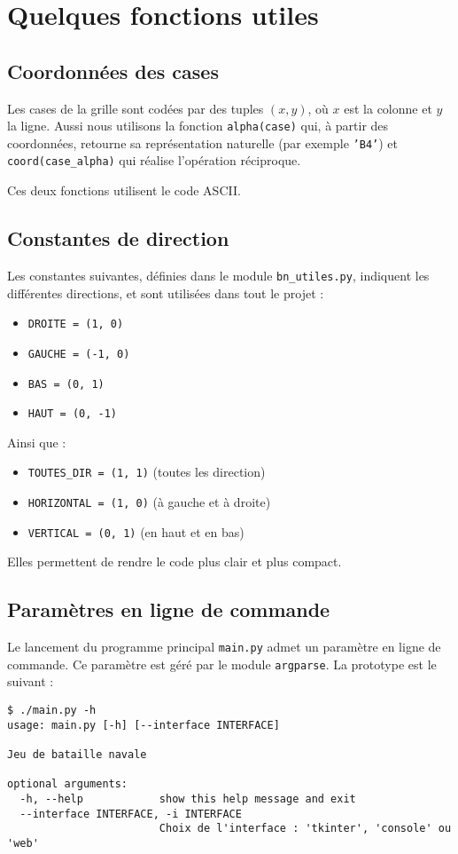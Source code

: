 \chapter{Quelques fonctions utiles}

\section{Coordonnées des cases}
Les cases de la grille sont codées par des tuples $(x,y)$, où $x$ est la colonne et $y$ la ligne. Aussi nous utilisons la fonction \texttt{alpha(case)} qui, à partir des coordonnées, retourne sa représentation naturelle (par exemple \texttt{'B4'}) et \texttt{coord(case\_alpha)} qui réalise l'opération réciproque.

Ces deux fonctions utilisent le code ASCII.

\section{Constantes de direction}
Les constantes suivantes, définies dans le module \texttt{bn\_utiles.py}, indiquent les différentes directions, et sont utilisées dans tout le projet :
\begin{itemize}
\item \texttt{DROITE = (1, 0)}
\item \texttt{GAUCHE = (-1, 0)}
\item \texttt{BAS = (0, 1)}
\item \texttt{HAUT = (0, -1)}
\end{itemize}
Ainsi que :
\begin{itemize}
\item \texttt{TOUTES\_DIR = (1, 1)} (toutes les direction)
\item \texttt{HORIZONTAL = (1, 0)} (à gauche et à droite)
\item \texttt{VERTICAL = (0, 1)} (en haut et en bas)
\end{itemize}
Elles permettent de rendre le code plus clair et plus compact.

\section{Paramètres en ligne de commande}
Le lancement du programme principal \texttt{main.py} admet un paramètre en ligne de commande. Ce paramètre est géré par le module \texttt{argparse}. La prototype est le suivant :

\begin{verbatim}
$ ./main.py -h
usage: main.py [-h] [--interface INTERFACE]

Jeu de bataille navale

optional arguments:
  -h, --help            show this help message and exit
  --interface INTERFACE, -i INTERFACE
                        Choix de l'interface : 'tkinter', 'console' ou 'web'
\end{verbatim}